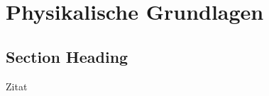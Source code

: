 \chapter{Physikalische Grundlagen}
\label{physics} %



\section{Section Heading}

Zitat \cite{alhazmi_live_2024}

\printbibliography

